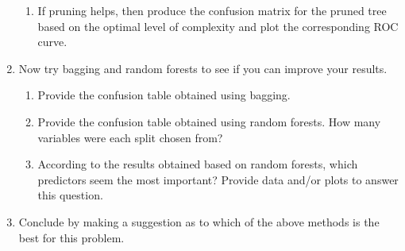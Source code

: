 \documentclass[11pt]{article}
\begin{document}
\begin{enumerate}
\begin{enumerate}
    \item If pruning helps, then produce the confusion matrix for the pruned tree based on the optimal level of complexity and plot the corresponding ROC curve.
  \end{enumerate}
\item Now try bagging and random forests to see if you can improve your results.
  \begin{enumerate}
  \item Provide the confusion table obtained using bagging.
  \item Provide the confusion table obtained using random forests. How many variables were each split chosen from? 
      \item According to the results obtained based on random forests, which predictors seem the most important? Provide data and/or plots to answer this question.
  \end{enumerate}
  \item Conclude by making a suggestion as to which of the above methods is the best for this problem.
  \end{enumerate}
\end{document}
